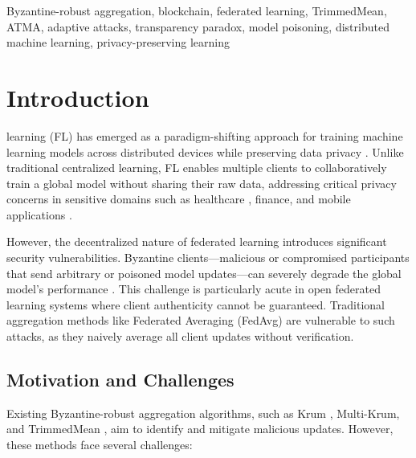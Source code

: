 \documentclass{ieeeaccess}
\begin{document}
\begin{keywords}
Byzantine-robust aggregation, blockchain, federated learning, TrimmedMean, ATMA, adaptive attacks, transparency paradox, model poisoning, distributed machine learning, privacy-preserving learning
\end{keywords}

\titlepgskip=-21pt

\maketitle

\section{Introduction}
\label{sec:introduction}

 learning (FL) has emerged as a paradigm-shifting approach for training machine learning models across distributed devices while preserving data privacy \cite{mcmahan2017communication,kairouz2021advances}. Unlike traditional centralized learning, FL enables multiple clients to collaboratively train a global model without sharing their raw data, addressing critical privacy concerns in sensitive domains such as healthcare \cite{xu2021federated}, finance, and mobile applications \cite{kang2020reliable}.

However, the decentralized nature of federated learning introduces significant security vulnerabilities. Byzantine clients---malicious or compromised participants that send arbitrary or poisoned model updates---can severely degrade the global model's performance \cite{blanchard2017machine,yin2018byzantine,cao2024comprehensive}. This challenge is particularly acute in open federated learning systems where client authenticity cannot be guaranteed. Traditional aggregation methods like Federated Averaging (FedAvg) \cite{mcmahan2017communication} are vulnerable to such attacks, as they naively average all client updates without verification.

\subsection{Motivation and Challenges}

Existing Byzantine-robust aggregation algorithms, such as Krum \cite{blanchard2017machine}, Multi-Krum, and TrimmedMean \cite{yin2018byzantine}, aim to identify and mitigate malicious updates. However, these methods face several challenges:
\end{document}
